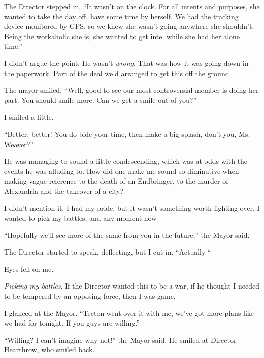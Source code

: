 The Director stepped in, ``It wasn't on the clock.  For all intents and purposes, she wanted to take the day off, have some time by herself.  We had the tracking device monitored by GPS, so we knew she wasn't going anywhere she shouldn't.  Being the workaholic she is, she wanted to get intel while she had her alone time.''



I didn't argue the point.  He wasn't \emph{wrong}.  That was how it was going down in the paperwork.  Part of the deal we'd arranged to get this off the ground.



The mayor smiled.  ``Well, good to see our most controversial member is doing her part.   You should smile more.  Can we get a smile out of you?''



I smiled a little.



``Better, better!  You do bide your time, then make a big splash, don't you, Ms. Weaver?''



He was managing to sound a little condescending, which was at odds with the events he was alluding to.  How did one make me sound so diminutive when making vague reference to the death of an Endbringer, to the murder of Alexandria and the takeover of a city?



I didn't mention it.  I had my pride, but it wasn't something worth fighting over.  I wanted to pick my battles, and any moment now-



``Hopefully we'll see more of the same from you in the future,'' the Mayor said.



The Director started to speak, deflecting, but I cut in.  ``Actually-``



Eyes fell on me.



\emph{Picking my battles}.  If the Director wanted this to be a war, if he thought I needed to be tempered by an opposing force, then I was game.



I glanced at the Mayor.  ``Tecton went over it with me, we've got more plans like we had for tonight.  If you guys are willing.''



``Willing?  I can't imagine why not!'' the Mayor said.  He smiled at Director Hearthrow, who smiled back.



